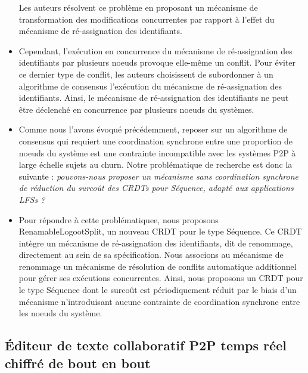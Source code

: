\begin{itemize}
        Les auteurs résolvent ce problème en proposant un mécanisme de transformation des modifications concurrentes par rapport à l'effet du mécanisme de ré-assignation des identifiants.
    \item Cependant, l'exécution en concurrence du mécanisme de ré-assignation des identifiants par plusieurs noeuds provoque elle-même un conflit.
        Pour éviter ce dernier type de conflit, les auteurs choisissent de subordonner à un algorithme de consensus l'exécution du mécanisme de ré-assignation des identifiants.
        Ainsi, le mécanisme de ré-assignation des identifiants ne peut être déclenché en concurrence par plusieurs noeuds du systèmes.
    \item Comme nous l'avons évoqué précédemment, reposer sur un algorithme de consensus qui requiert une coordination synchrone entre une proportion de noeuds du système est une contrainte incompatible avec les systèmes \ac{P2P} à large échelle sujets au churn.
        Notre problématique de recherche est donc la suivante : \emph{pouvons-nous proposer un mécanisme sans coordination synchrone de réduction du surcoût des \acp{CRDT} pour Séquence, \ie adapté aux applications \acp{LFS} ?}
    \item Pour répondre à cette problématiquee, nous proposons RenamableLogootSplit, un nouveau \ac{CRDT} pour le type Séquence.
        Ce \ac{CRDT} intègre un mécanisme de ré-assignation des identifiants, dit de renommage, directement au sein de sa spécification.
        Nous associons au mécanisme de renommage un mécanisme de résolution de conflits automatique additionnel pour gérer ses exécutions concurrentes.
        Ainsi, nous proposons un \ac{CRDT} pour le type Séquence dont le surcoût est périodiquement réduit par le biais d'un mécanisme n'introduisant aucune contrainte de coordination synchrone entre les noeuds du système.
\end{itemize}

\subsection{Éditeur de texte collaboratif \ac{P2P} temps réel chiffré de bout en bout}

